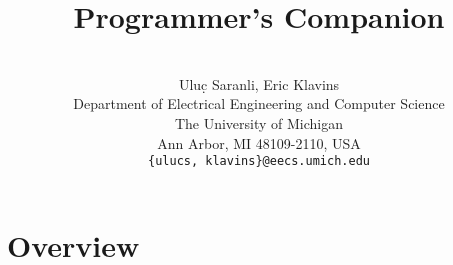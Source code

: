 \documentclass[12pt, letterpaper]{article}
\begin{document}

\title{\bf {\Huge \rhexlib Programmer's Companion}}
\author{
  \vspace{0.2in}\\
  {\Large Ulu\d{c} Saranli, Eric Klavins \vspace{0.3in} } \\
  Department of Electrical Engineering and Computer Science \\
  The University of Michigan \\
  Ann Arbor, MI 48109-2110, USA\\
  {\tt \{ulucs, klavins\}@eecs.umich.edu}}
\date{}
\maketitle



\vspace{0.3in}
\begin{abstract}
\end{abstract}


\thispagestyle{empty}




\newpage

\tableofcontents

\newpage

\section{Overview}
\end{document}
